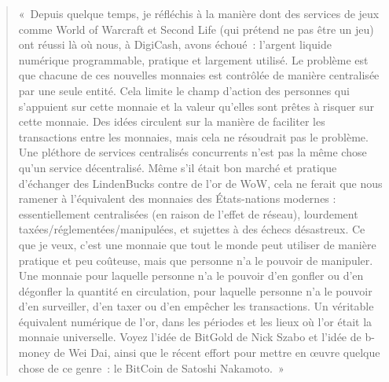 \begin{quote}
«~Depuis quelque temps, je réfléchis à la manière dont des services de jeux comme World of Warcraft et Second Life (qui prétend ne pas être un jeu) ont réussi là où nous, à DigiCash, avons échoué~: l'argent liquide numérique programmable, pratique et largement utilisé. Le problème est que chacune de ces nouvelles monnaies est contrôlée de manière centralisée par une seule entité. Cela limite le champ d'action des personnes qui s'appuient sur cette monnaie et la valeur qu'elles sont prêtes à risquer sur cette monnaie. Des idées circulent sur la manière de faciliter les transactions entre les monnaies, mais cela ne résoudrait pas le problème. Une pléthore de services centralisés concurrents n'est pas la même chose qu'un service décentralisé. Même s'il était bon marché et pratique d'échanger des LindenBucks contre de l'or de WoW, cela ne ferait que nous ramener à l'équivalent des monnaies des États-nations modernes : essentiellement centralisées (en raison de l'effet de réseau), lourdement taxées/réglementées/manipulées, et sujettes à des échecs désastreux. Ce que je veux, c'est une monnaie que tout le monde peut utiliser de manière pratique et peu coûteuse, mais que personne n'a le pouvoir de manipuler. Une monnaie pour laquelle personne n'a le pouvoir d'en gonfler ou d'en dégonfler la quantité en circulation, pour laquelle personne n'a le pouvoir d'en surveiller, d'en taxer ou d'en empêcher les transactions. Un véritable équivalent numérique de l'or, dans les périodes et les lieux où l'or était la monnaie universelle. Voyez l'idée de BitGold de Nick Szabo et l'idée de b-money de Wei Dai, ainsi que le récent effort pour mettre en œuvre quelque chose de ce genre~: le BitCoin de Satoshi Nakamoto.~»

\end{quote}
